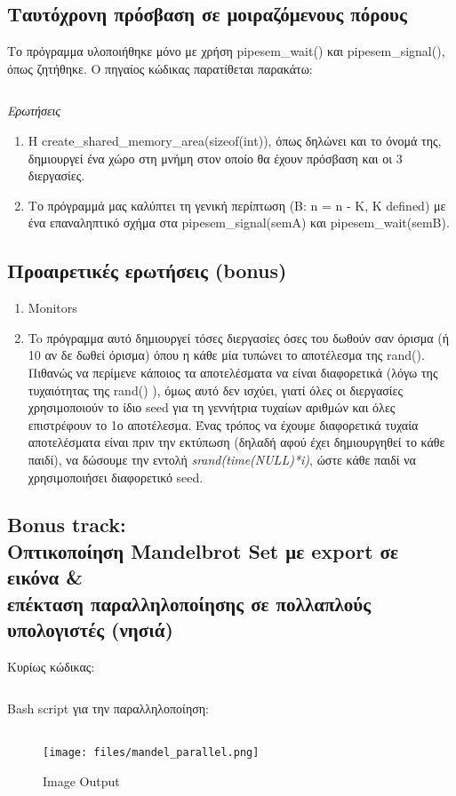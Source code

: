 \documentclass[a4paper,10pt]{article} \usepackage{anysize}
\begin{document}
\pagebreak

\subsection{Ταυτόχρονη πρόσβαση σε μοιραζόμενους πόρους} 
Το πρόγραμμα υλοποιήθηκε μόνο με χρήση pipesem\_wait() και pipesem\_signal(), όπως ζητήθηκε.
Ο πηγαίος κώδικας παρατίθεται παρακάτω:
\inputminted[linenos,fontsize=\footnotesize,frame=leftline]{c}{files/procs-shm.c}
\newpage

\emph{Ερωτήσεις}
\begin{enumerate}
\item Η create\_shared\_memory\_area(sizeof(int)), όπως δηλώνει και το όνομά της, δημιουργεί ένα χώρο στη μνήμη στον οποίο θα έχουν πρόσβαση και οι 3
διεργασίες.
\item Το πρόγραμμά μας καλύπτει τη γενική περίπτωση (Β: n = n - K,  K defined) με ένα επαναληπτικό σχήμα στα pipesem\_signal(semA) και 
pipesem\_wait(semB).
\end{enumerate}

\subsection{Προαιρετικές ερωτήσεις (bonus)} 

\begin{enumerate}
\item Monitors

\item To πρόγραμμα αυτό δημιουργεί τόσες διεργασίες όσες του δωθούν σαν όρισμα (ή 10 αν δε δωθεί όρισμα) όπου η κάθε μία τυπώνει το αποτέλεσμα 
της rand(). Πιθανώς να περίμενε κάποιος τα αποτελέσματα να είναι διαφορετικά (λόγω της τυχαιότητας της rand() ), όμως αυτό δεν ισχύει, γιατί όλες οι διεργασίες χρησιμοποιούν το ίδιο seed για τη γεννήτρια τυχαίων αριθμών και όλες επιστρέφουν το 1ο αποτέλεσμα.
Ένας τρόπος να έχουμε διαφορετικά τυχαία αποτελέσματα είναι πριν την εκτύπωση (δηλαδή αφού έχει δημιουργηθεί το κάθε παιδί), να δώσουμε την εντολή 
\emph{srand(time(NULL)*i)}, ώστε κάθε παιδί να χρησιμοποιήσει διαφορετικό seed.   
\end{enumerate}

\subsection{Bonus track: \\Οπτικοποίηση Mandelbrot Set με export σε εικόνα \& \\επέκταση παραλληλοποίησης σε πολλαπλούς υπολογιστές (νησιά)}
\noindent Κυρίως κώδικας:

\inputminted[linenos,fontsize=\footnotesize,frame=leftline]{c}{files/mandel_parallel.c}

\noindent Bash script για την παραλληλοποίηση:

\inputminted[linenos,fontsize=\footnotesize,frame=leftline]{bash}{files/runem.sh}
\begin{figure}[H]
\centering
\texttt{[image: files/mandel\_parallel.png]}
\caption{Image Output}
\end{figure}
\end{document}
